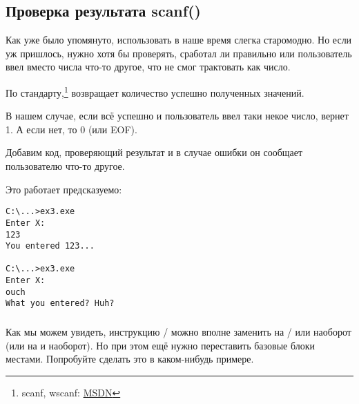 \subsection{Проверка результата scanf()}

Как уже было упомянуто, использовать \scanf в наше время слегка старомодно. 
Но если уж пришлось, нужно хотя бы проверять, сработал ли \scanf 
правильно или пользователь ввел вместо числа что-то другое, что \scanf не смог трактовать как число.



По стандарту,\scanf\footnote{scanf, wscanf: \href{http://msdn.microsoft.com/en-us/library/9y6s16x1(VS.71).aspx}{MSDN}} возвращает количество успешно полученных значений.

В нашем случае, если всё успешно и пользователь ввел таки некое число, \scanf вернет 1. А если нет, то 0 (или \ac{EOF}).

Добавим код, проверяющий результат \scanf и в случае ошибки он сообщает пользователю что-то другое.

Это работает предсказуемо:

\begin{lstlisting}
C:\...>ex3.exe
Enter X:
123
You entered 123...

C:\...>ex3.exe
Enter X:
ouch
What you entered? Huh?
\end{lstlisting}






\subsubsection{\Exercise}

Как мы можем увидеть, инструкцию / можно вполне заменить на / или наоборот 
(или  на  и наоборот).
Но при этом ещё нужно переставить базовые блоки местами.
Попробуйте сделать это в каком-нибудь примере.
